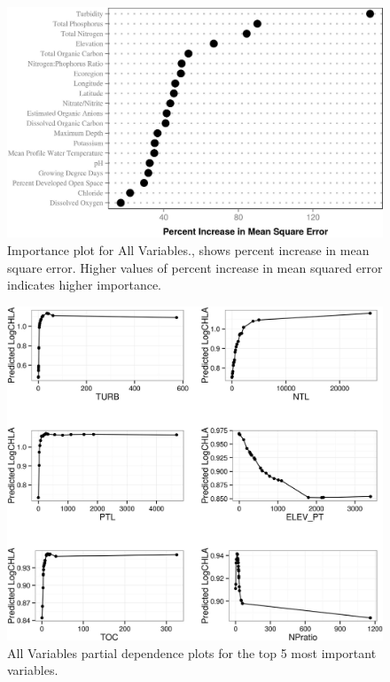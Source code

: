 \documentclass[11pt,]{article}
\begin{document}
\begin{figure}[htbp]
\centering
\includegraphics{manuscript_files/figure-latex/All_Importance-1.jpeg}
\caption{Importance plot for All Variables., shows percent increase in
mean square error. Higher values of percent increase in mean squared
error indicates higher importance. \label{fig:All_Importance}}
\end{figure}

\newpage

\begin{figure}[htbp]
\centering
\includegraphics{manuscript_files/figure-latex/all_partial_dependence-1.jpeg}
\caption{All Variables partial dependence plots for the top 5 most
important variables. \label{fig:all_partial_dependence}}
\end{figure}
\end{document}
